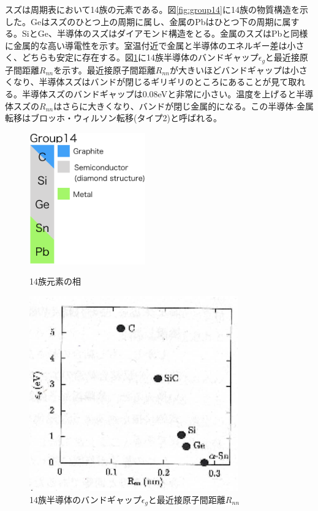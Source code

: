 スズは周期表において14族の元素である。図\ref{fig:group14}に14族の物質構造を示した。Geはスズのひとつ上の周期に属し、金属のPbはひとつ下の周期に属する。SiとGe、半導体のスズはダイアモンド構造をとる。金属のスズはPbと同様に金属的な高い導電性を示す。室温付近で金属と半導体のエネルギー差は小さく、どちらも安定に存在する。図\ref{fig:bandgaps}に14族半導体のバンドギャップ$\epsilon_g$と最近接原子間距離$R_{nn}$を示す\cite{Yonezawa}。最近接原子間距離$R_{nn}$が大きいほどバンドギャップは小さくなり、半導体スズはバンドが閉じるギリギリのところにあることが見て取れる。半導体スズのバンドギャップは0.08eVと非常に小さい。温度を上げると半導体スズの$R_{nn}$はさらに大きくなり、バンドが閉じ金属的になる。この半導体-金属転移はブロッホ・ウィルソン転移(タイプ2)と呼ばれる\cite{Yonezawa}。

\begin{figure}[!h]
 \begin{minipage}{0.4\hsize}
  \begin{center}
   \includegraphics[width=50mm]{Introduction/group14.eps}
  \end{center}
  \caption{14族元素の相}
  \label{fig:group14}
 \end{minipage}
 \begin{minipage}{0.6\hsize}
  \begin{center}
   \includegraphics[width=90mm]{Introduction/bandgaps.eps}
  \end{center}
  \caption{14族半導体のバンドギャップ$\epsilon_g$と最近接原子間距離$R_{nn}$\cite{Yonezawa}}
  \label{fig:bandgaps}
 \end{minipage}
\end{figure}



